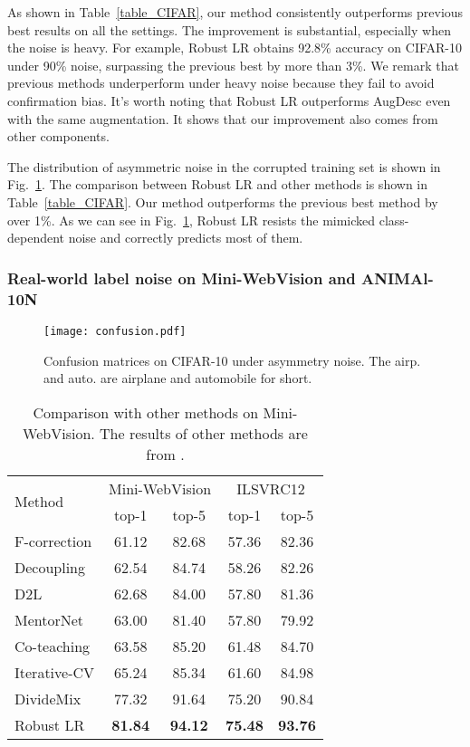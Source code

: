 \documentclass[letterpaper]{article} \usepackage{aaai23}  \usepackage{times}  \usepackage{helvet}  \usepackage{courier}  \usepackage[hyphens]{url}  \usepackage{graphicx} \urlstyle{rm} \def\UrlFont{\rm}  \usepackage{natbib}  \usepackage{caption} \frenchspacing  \setlength{\pdfpagewidth}{8.5in} \setlength{\pdfpageheight}{11in} \usepackage{algorithm}
\begin{document}
As shown in Table~\ref{table_CIFAR}, our method consistently outperforms previous best results on all the settings. 
The improvement is substantial, especially when the noise is heavy.
For example, Robust LR obtains 92.8\% accuracy on CIFAR-10 under 90\% noise, surpassing the previous best by more than 3\%.
We remark that previous methods underperform under heavy noise because they fail to avoid confirmation bias.
It's worth noting that Robust LR outperforms AugDesc even with the same augmentation. 
It shows that our improvement also comes from other components.



The distribution of asymmetric noise in the corrupted training set is shown in Fig.~\ref{fig_confison}.
The comparison between Robust LR and other methods is shown in Table~\ref{table_CIFAR}.
Our method outperforms the previous best method by over 1\%.
As we can see in Fig.~\ref{fig_confison}, Robust LR resists the mimicked class-dependent noise and correctly predicts most of them.

\subsubsection{Real-world label noise on Mini-WebVision and ANIMAl-10N}

\begin{figure}[h!]
    \centering
    \texttt{[image: confusion.pdf]} 
    \caption{Confusion matrices on CIFAR-10 under asymmetry noise. The airp. and auto. are airplane and automobile for short.} 
    \label{fig_confison}
\end{figure}

\begin{table}
\centering
\begin{tabular}{l|cc|cc}
    \toprule
    \multirow{2}{*}{Method} & \multicolumn{2}{c|}{Mini-WebVision} & \multicolumn{2}{c}{ILSVRC12} \\ \cmidrule(r){2-3}\cmidrule(l){4-5}
                                & top-1  & top-5  & top-1  & top-5  \\ \midrule
        F-correction            & 61.12 & 82.68 & 57.36 & 82.36 \\
        Decoupling              & 62.54 & 84.74 & 58.26 & 82.26 \\
        D2L                     & 62.68 & 84.00 & 57.80 & 81.36 \\
        MentorNet               & 63.00 & 81.40 & 57.80 & 79.92 \\
        Co-teaching             & 63.58 & 85.20 & 61.48 & 84.70 \\
        Iterative-CV            & 65.24 & 85.34 & 61.60 & 84.98 \\
        DivideMix               & 77.32 & 91.64 & 75.20 & 90.84 \\ 
        Robust LR                      & \textbf{81.84} & \textbf{94.12} & \textbf{75.48} & \textbf{93.76} \\ \bottomrule
    \end{tabular}
\caption{Comparison with other methods on Mini-WebVision. The results of other methods are from \cite{li2020dividemix}.}
\label{table_webvision}
\end{table}
\end{document}
